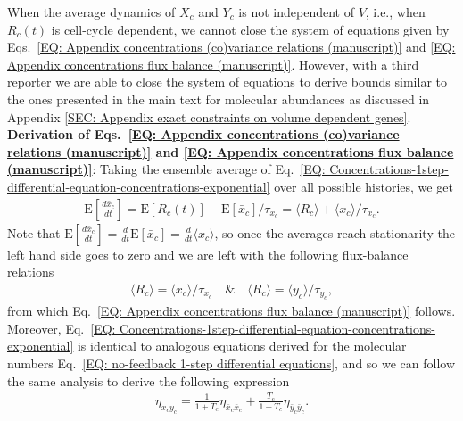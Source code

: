 \documentclass[%
 reprint,prx,
superscriptaddress,
%
%
%
%
%
%
%
%
%
 amsmath,amssymb,
 aps,
%
%
%
%
%
%
]{revtex4-2}
\begin{document}
{{When the average dynamics of $X_{c}$ and $Y_{c}$ is not independent of $V$, i.e., when $R_{c}(t)$ is cell-cycle dependent, we cannot close the system of equations given by Eqs.~\eqref{EQ: Appendix concentrations (co)variance relations (manuscript)} and \eqref{EQ: Appendix concentrations flux balance (manuscript)}. However, with a third reporter we are able to close the system of equations to derive bounds similar to the ones presented in the main text for molecular abundances as discussed in Appendix \ref{SEC: Appendix exact constraints on volume dependent genes}.\\


\noindent \textbf{Derivation of Eqs.~\eqref{EQ: Appendix concentrations (co)variance relations (manuscript)} and \eqref{EQ: Appendix concentrations flux balance (manuscript)}}: Taking the ensemble average of Eq.~\eqref{EQ: Concentrations-1step-differential-equation-concentrations-exponential} over all possible histories, we get
\begin{align*}
 \mathrm{E}\left[ \frac{d\bar{x}_{c}}{dt} \right] = \mathrm{E}[ R_{c}(t) ] - \mathrm{E}[ \bar{x}_{c} ]/\tau_{x_{c}} = \langle R_{c} \rangle + \langle x_{c} \rangle/\tau_{x_{c}} .
\end{align*}
Note that $\mathrm{E}\left[ \frac{d\bar{x}_{c}}{dt} \right] = \frac{d}{dt}\mathrm{E}[\bar{x}_{c}] = \frac{d}{dt}\langle x_{c} \rangle$, so once
the averages reach stationarity the left hand side goes to zero and we are left with the following flux-balance relations
\begin{align}
 \langle R_{c} \rangle = \langle x_{c} \rangle / \tau_{x_{c}} \quad \text{\&} \quad \langle R_{c} \rangle = \langle y_{c} \rangle / \tau_{y_{c}} ,
 \label{EQ: Concentrations-1step-flux-balance}
\end{align}
from which Eq.~\eqref{EQ: Appendix concentrations flux balance (manuscript)} follows.
Moreover, Eq.~\eqref{EQ: Concentrations-1step-differential-equation-concentrations-exponential} is identical to analogous equations derived for the molecular numbers Eq.~\eqref{EQ: no-feedback 1-step differential equations}, and so we can follow the same analysis to derive the following expression
\begin{align*}
 \eta_{x_{c}y_{c}} = \frac{1}{1+T_{c}}\eta_{\bar{x}_{c}\bar{x}_{c}} + \frac{T_{c}}{1+T_{c}}\eta_{\bar{y}_{c}\bar{y}_{c}}.
\end{align*}

%
%
%
%
%

%
%

}}
\end{document}
